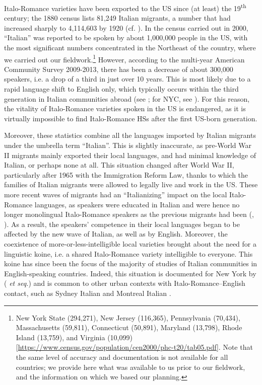 \documentclass[output=paper,hidelinks]{langscibook}
\begin{document}
Italo-Romance varieties have been exported to the US since (at least) the 19\textsuperscript{th} century; the 1880 census lists 81,249 Italian migrants, a number that had increased sharply to 4,114,603 by 1920 (cf. \citealt{Cavaioli2008}). In the census carried out in 2000, ``Italian'' was reported to be spoken by about 1,000,000 people in the US, with the most significant numbers concentrated in the Northeast of the country, where we carried out our fieldwork.\footnote{New York State (294,271), New Jersey (116,365), Pennsylvania (70,434), Massachusetts (59,811), Connecticut (50,891), Maryland (13,798), Rhode Island (13,759), and Virginia (10,099) [\url{https://www.census.gov/population/cen2000/phc-t20/tab05.pdf}]. Note that the same level of accuracy and documentation is not available for all countries; we provide here what was available to us prior to our fieldwork, and the information on which we based our planning.} However, according to the multi-year American Community Survey 2009-2013, there has been a decrease of about 300,000 speakers, i.e. a drop of a third in just over 10 years. This is most likely due to a rapid language shift to English only, which typically occurs within the third generation in Italian communities abroad (see \citealt{DeFina2014}; for NYC, see \citealt{Haller1987, Haller1993}). For this reason, the vitality of Italo-Romance varieties spoken in the US is endangered, as it is virtually impossible to find Italo-Romance HSs after the first US-born generation. 

Moreover, these statistics combine all the languages imported by Italian migrants under the umbrella term ``Italian''. This is slightly inaccurate, as pre-World War II migrants mainly exported their local languages, and had minimal knowledge of Italian, or perhaps none at all. This situation changed after World War II, particularly after 1965 with the Immigration Reform Law, thanks to which the families of Italian migrants were allowed to legally live and work in the US. These more recent waves of migrants had an ``Italianizing'' impact on the local Italo-Romance languages, as speakers were educated in Italian and were hence no longer monolingual Italo-Romance speakers as the previous migrants had been (\citealt[391--392]{Haller1991}, \citealt{DeFinaFellin2010}). As a result, the speakers’ competence in their local languages began to be affected by the new wave of Italian, as well as by English. Moreover, the coexistence of more-or-less-intelligible local varieties brought about the need for a linguistic koine, i.e. a shared Italo-Romance variety intelligible to everyone. This koine has since been the focus of the majority of studies of Italian communities in English-speaking countries. Indeed, this situation is documented for New York by \citeauthor{Haller1987} (\citeyear{Haller1987} \textit{et seq.}) and is common to other urban contexts with Italo-Romance--English contact, such as Sydney Italian \citep{Bettoni1990, Bettoni1991} and Montreal Italian \citep{Reinke2014}. 
\end{document}
